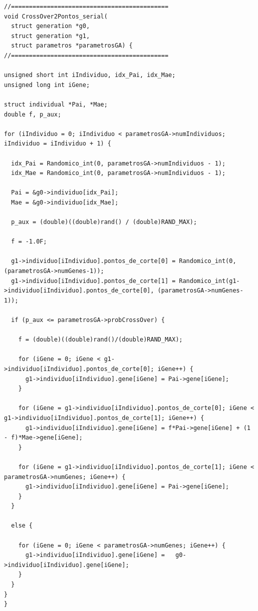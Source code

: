 \vspace{1 cm}
\begin{lstlisting}
//============================================
void CrossOver2Pontos_serial(
  struct generation *g0,
  struct generation *g1,
  struct parametros *parametrosGA) {
//============================================

unsigned short int iIndividuo, idx_Pai, idx_Mae;
unsigned long int iGene;

struct individual *Pai, *Mae;
double f, p_aux;

for (iIndividuo = 0; iIndividuo < parametrosGA->numIndividuos; iIndividuo = iIndividuo + 1) {	

  idx_Pai = Randomico_int(0, parametrosGA->numIndividuos - 1);
  idx_Mae = Randomico_int(0, parametrosGA->numIndividuos - 1);

  Pai = &g0->individuo[idx_Pai];
  Mae = &g0->individuo[idx_Mae];

  p_aux = (double)((double)rand() / (double)RAND_MAX);

  f = -1.0F;

  g1->individuo[iIndividuo].pontos_de_corte[0] = Randomico_int(0, (parametrosGA->numGenes-1));
  g1->individuo[iIndividuo].pontos_de_corte[1] = Randomico_int(g1->individuo[iIndividuo].pontos_de_corte[0], (parametrosGA->numGenes-1));

  if (p_aux <= parametrosGA->probCrossOver) {

    f = (double)((double)rand()/(double)RAND_MAX);

    for (iGene = 0; iGene < g1->individuo[iIndividuo].pontos_de_corte[0]; iGene++) {
      g1->individuo[iIndividuo].gene[iGene] = Pai->gene[iGene];				
    }

    for (iGene = g1->individuo[iIndividuo].pontos_de_corte[0]; iGene < g1->individuo[iIndividuo].pontos_de_corte[1]; iGene++) {				
      g1->individuo[iIndividuo].gene[iGene] = f*Pai->gene[iGene] + (1 - f)*Mae->gene[iGene];				
    }

    for (iGene = g1->individuo[iIndividuo].pontos_de_corte[1]; iGene < parametrosGA->numGenes; iGene++) {
      g1->individuo[iIndividuo].gene[iGene] = Pai->gene[iGene];				
    }
  }
	
  else {
	
    for (iGene = 0; iGene < parametrosGA->numGenes; iGene++) {
      g1->individuo[iIndividuo].gene[iGene] =	g0->individuo[iIndividuo].gene[iGene];			
    }
  }
}
}
\end{lstlisting}
\vspace{1 cm}


